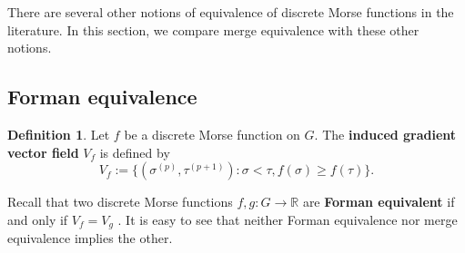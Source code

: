 \documentclass{article}
\theoremstyle{definition}
\newtheorem{definition}{Definition}[section]
\newcommand{\RR}    {\mathbb{R}}
\begin{document}
There are several other notions of equivalence of discrete Morse functions in the literature.  In this section, we compare merge equivalence with these other notions.


\subsection{Forman equivalence}


\begin{definition}\label{defn gvf} Let $f$ be a discrete Morse function on $G$.  The  \textbf{induced gradient vector field} $V_f$ is defined by
$$V_f:=\{(\sigma^{(p)}, \tau^{(p+1)}) : \sigma< \tau, f(\sigma)\geq f(\tau)\}.
$$
\end{definition}
Recall that two discrete Morse functions $f,g\colon G \to \RR$ are \textbf{Forman equivalent} if and only if $V_f=V_g$ \cite{Ayala09}. It is easy to see that neither Forman equivalence nor merge equivalence implies the other.
\end{document}
